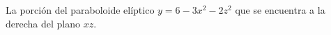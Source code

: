 \item La porción del paraboloide elíptico $y = 6 - 3x^2 - 2z^2$ que se encuentra a la derecha del plano $xz$.
